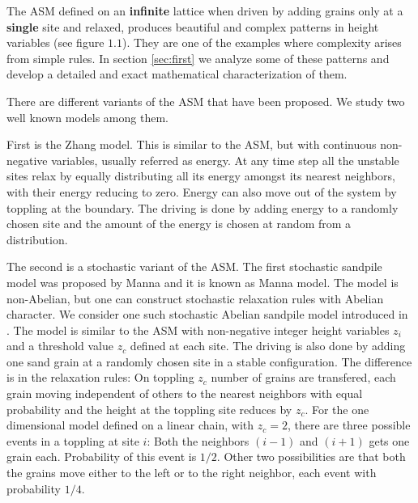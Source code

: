 \documentclass[11pt,a4paper]{book}
\begin{document}
The ASM defined on an \textbf{infinite} lattice when driven by adding grains
only at a \textbf{single} site and relaxed, produces beautiful and complex patterns in
height variables (see figure $1.1$). They are one of the
examples where complexity arises from simple rules. In section \ref{sec:first} we
analyze some of these patterns and develop a detailed and exact mathematical
characterization of them.

There are different variants of the ASM that have been proposed. We study
two well known models among them.

First is the Zhang model. This is similar to the ASM, but with
continuous non-negative variables, usually referred as energy.
At any time step all the unstable sites relax by equally distributing all
its energy amongst its nearest neighbors, with their energy reducing to
zero. Energy can also move out of the system by toppling at the
boundary. The driving is done by adding energy to a randomly chosen
site and the amount of the energy is chosen at random from a
distribution.

The second is a stochastic variant of the ASM.
The first stochastic sandpile model was proposed
by Manna and it is known as Manna model\cite{manna}. The model is non-Abelian, but one
can construct stochastic relaxation rules with Abelian character. We
consider one such stochastic Abelian sandpile model introduced in
\cite{dm}. The model is similar to the ASM with non-negative integer height variables
$z_{i}$ and a threshold value $z_{c}$ defined at each site. The
driving is also done by adding one sand grain at a
randomly chosen site in a stable configuration. The difference is in
the relaxation rules: On toppling $z_{c}$ number of grains are
transfered, each grain moving independent of others to the nearest neighbors with equal
probability and the height at the toppling site reduces by
$z_{c}$. For the one dimensional model defined on a linear chain,
with $z_{c}=2$, there are three possible events in a toppling at site
$i$: Both the neighbors $\left( i-1 \right)$ and $\left( i+1 \right)$
gets one grain each. Probability of this event is $1/2$. Other two
possibilities are that both the grains move either to the left or to
the right neighbor, each event with probability $1/4$.
\end{document}
